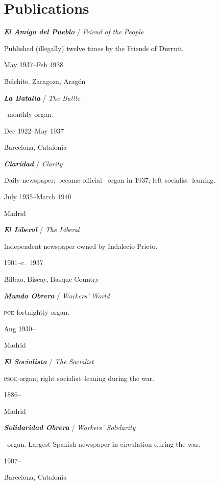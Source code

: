 \section{Publications}

\begin{multicols}{2}
  \RaggedRight
  \setlength{\parskip}{0.25\baselineskip}
  
  \textbf{\emph{El Amigo del Pueblo}}
  / \emph{Friend of the People}
  
  Published (illegally) twelve times by the Friends of Durruti. 
  
  May 1937--Feb 1938
  
  Belchite, Zaragoza, Aragón

  \bigskip

  \textbf{\emph{La Batalla}}
  / \emph{The Battle}

  \POUM\ monthly organ.
  
  Dec 1922--May 1937
  
  Barcelona, Catalonia

  \bigskip
  
  \textbf{\emph{Claridad}}
  / \emph{Clarity}

  Daily newspaper; became official \UGT\ organ in 1937; left socialist–leaning.
  
  July 1935--March 1940
  
  Madrid
  
  \bigskip
  
  \textbf{\emph{El Liberal}}
  / \emph{The Liberal}

  Independent newspaper owned by Indalecio Prieto.
  
  1901--c.~1937
  
  Bilbao, Biscay\kn, Basque Country

  \bigskip

  \textbf{\emph{Mundo Obrero}}
  / \emph{Workers' World}

  \textsc{pce} fortnightly organ.
  
  Aug 1930--
  
  Madrid
  
  \bigskip
  
  \textbf{\emph{El Socialista}}
  / \emph{The Socialist}

  \textsc{psoe} organ; right socialist–leaning during the war.
  
  1886--
  
  Madrid

  \bigskip
  
  \textbf{\emph{Solidaridad Obrera}}
  / \emph{Workers’ Solidarity}

  \CNT\ organ. Largest Spanish newspaper in circulation during the war.
  
  1907--
  
  Barcelona, Catalonia

\end{multicols}